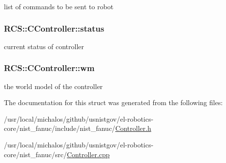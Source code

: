 list of commands to be sent to robot \hypertarget{structRCS_1_1CController_a82e9cc233cd25554964efe8a9008e0b2}{
\subsubsection[{status}]{ R\-C\-S\-::\-C\-Controller\-::status\hspace{0.3cm}{\ttfamily [static]}}}\label{structRCS_1_1CController_a82e9cc233cd25554964efe8a9008e0b2}
current status of controller \hypertarget{structRCS_1_1CController_a2b5d355e3e9d6195943ab148c1f94083}{
\subsubsection[{wm}]{ R\-C\-S\-::\-C\-Controller\-::wm\hspace{0.3cm}{\ttfamily [static]}}}\label{structRCS_1_1CController_a2b5d355e3e9d6195943ab148c1f94083}
the world model of the controller 

The documentation for this struct was generated from the following files\-:\begin{DoxyCompactItemize}
\item 
/usr/local/michalos/github/usnistgov/el-\/robotics-\/core/nist\-\_\-fanuc/include/nist\-\_\-fanuc/\hyperlink{Controller_8h}{Controller.\-h}\item 
/usr/local/michalos/github/usnistgov/el-\/robotics-\/core/nist\-\_\-fanuc/src/\hyperlink{Controller_8cpp}{Controller.\-cpp}\end{DoxyCompactItemize}
